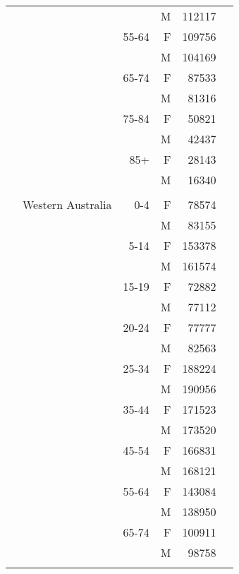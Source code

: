 \begin{tabular}{@{}c@{}rrrr@{}c@{}}
\phantom{.} &                                &        &  M &  112117 &\tabularnewline\relax 
\phantom{.} &                                &  55-64 &  F &  109756 &\tabularnewline\relax 
\phantom{.} &                                &        &  M &  104169 &\tabularnewline\relax 
\phantom{.} &                                &  65-74 &  F &   87533 &\tabularnewline\relax 
\phantom{.} &                                &        &  M &   81316 &\tabularnewline\relax 
\phantom{.} &                                &  75-84 &  F &   50821 &\tabularnewline\relax 
\phantom{.} &                                &        &  M &   42437 &\tabularnewline\relax 
\phantom{.} &                                &    85+ &  F &   28143 &\tabularnewline\relax 
\phantom{.} &                                &        &  M &   16340 &\tabularnewline\relax 
\phantom{.} &            &            &            &            &\tabularnewline[0.5\baselineskip]
\phantom{.} &              Western Australia &    0-4 &  F &   78574 &\tabularnewline\relax 
\phantom{.} &                                &        &  M &   83155 &\tabularnewline\relax 
\phantom{.} &                                &   5-14 &  F &  153378 &\tabularnewline\relax 
\phantom{.} &                                &        &  M &  161574 &\tabularnewline\relax 
\phantom{.} &                                &  15-19 &  F &   72882 &\tabularnewline\relax 
\phantom{.} &                                &        &  M &   77112 &\tabularnewline\relax 
\phantom{.} &                                &  20-24 &  F &   77777 &\tabularnewline\relax 
\phantom{.} &                                &        &  M &   82563 &\tabularnewline\relax 
\phantom{.} &                                &  25-34 &  F &  188224 &\tabularnewline\relax 
\phantom{.} &                                &        &  M &  190956 &\tabularnewline\relax 
\phantom{.} &                                &  35-44 &  F &  171523 &\tabularnewline\relax 
\phantom{.} &                                &        &  M &  173520 &\tabularnewline\relax 
\phantom{.} &                                &  45-54 &  F &  166831 &\tabularnewline\relax 
\phantom{.} &                                &        &  M &  168121 &\tabularnewline\relax 
\phantom{.} &                                &  55-64 &  F &  143084 &\tabularnewline\relax 
\phantom{.} &                                &        &  M &  138950 &\tabularnewline\relax 
\phantom{.} &                                &  65-74 &  F &  100911 &\tabularnewline\relax 
\phantom{.} &                                &        &  M &   98758 &\tabularnewline\relax 

\end{tabular}
